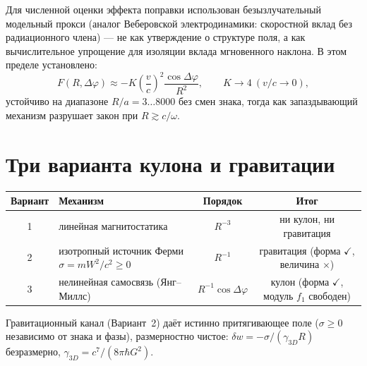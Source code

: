 \documentclass[11pt,a4paper]{article}
\begin{document}
Для численной оценки эффекта поправки использован безызлучательный
модельный прокси (аналог Веберовской электродинамики: скоростной вклад без
радиационного члена) --- не как утверждение о структуре поля, а как
вычислительное упрощение для изоляции вклада мгновенного наклона. В этом
пределе установлено:
\begin{equation}
F(R,\Delta\varphi)\approx-K\left(\frac{v}{c}\right)^2
\frac{\cos\Delta\varphi}{R^2},\qquad K\to4\ (v/c\to0),
\end{equation}
устойчиво на диапазоне $R/a=3\ldots8000$ без смен знака, тогда как
запаздывающий механизм разрушает закон при $R\gtrsim c/\omega$.

\section{Три варианта кулона и гравитации}
\begin{center}
\begin{tabular}{clcc}
\toprule
Вариант & Механизм & Порядок & Итог \\
\midrule
1 & линейная магнитостатика & $R^{-3}$ & ни кулон, ни гравитация \\
2 & изотропный источник Ферми $\sigma=mW^2/c^2\ge0$ & $R^{-1}$ & гравитация (форма $\checkmark$, величина $\times$) \\
3 & нелинейная самосвязь (Янг--Миллс) & $R^{-1}\cos\Delta\varphi$ & кулон (форма $\checkmark$, модуль $f_1$ свободен) \\
\bottomrule
\end{tabular}
\end{center}
Гравитационный канал (Вариант~2) даёт истинно притягивающее поле
($\sigma\ge0$ независимо от знака и фазы), размерностно чистое:
$\delta w=-\sigma/(\gamma_{3D}R)$ безразмерно, $\gamma_{3D}=c^7/(8\pi\hbar G^2)$.
\end{document}
